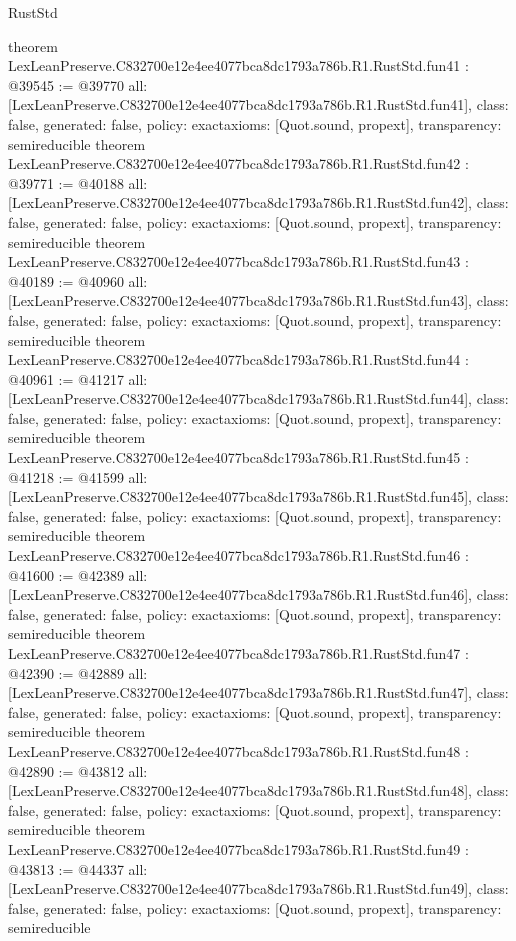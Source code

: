 \begin{lexlean}{RustStd}
\begin{coremodule}
{}
theorem LexLeanPreserve.C832700e12e4ee4077bca8dc1793a786b.R1.RustStd.fun41 : @39545 := @39770 {
  all: [LexLeanPreserve.C832700e12e4ee4077bca8dc1793a786b.R1.RustStd.fun41],
  class: false,
  generated: false,
  policy: exact{axioms: [Quot.sound, propext]},
  transparency: semireducible
}
theorem LexLeanPreserve.C832700e12e4ee4077bca8dc1793a786b.R1.RustStd.fun42 : @39771 := @40188 {
  all: [LexLeanPreserve.C832700e12e4ee4077bca8dc1793a786b.R1.RustStd.fun42],
  class: false,
  generated: false,
  policy: exact{axioms: [Quot.sound, propext]},
  transparency: semireducible
}
theorem LexLeanPreserve.C832700e12e4ee4077bca8dc1793a786b.R1.RustStd.fun43 : @40189 := @40960 {
  all: [LexLeanPreserve.C832700e12e4ee4077bca8dc1793a786b.R1.RustStd.fun43],
  class: false,
  generated: false,
  policy: exact{axioms: [Quot.sound, propext]},
  transparency: semireducible
}
theorem LexLeanPreserve.C832700e12e4ee4077bca8dc1793a786b.R1.RustStd.fun44 : @40961 := @41217 {
  all: [LexLeanPreserve.C832700e12e4ee4077bca8dc1793a786b.R1.RustStd.fun44],
  class: false,
  generated: false,
  policy: exact{axioms: [Quot.sound, propext]},
  transparency: semireducible
}
theorem LexLeanPreserve.C832700e12e4ee4077bca8dc1793a786b.R1.RustStd.fun45 : @41218 := @41599 {
  all: [LexLeanPreserve.C832700e12e4ee4077bca8dc1793a786b.R1.RustStd.fun45],
  class: false,
  generated: false,
  policy: exact{axioms: [Quot.sound, propext]},
  transparency: semireducible
}
theorem LexLeanPreserve.C832700e12e4ee4077bca8dc1793a786b.R1.RustStd.fun46 : @41600 := @42389 {
  all: [LexLeanPreserve.C832700e12e4ee4077bca8dc1793a786b.R1.RustStd.fun46],
  class: false,
  generated: false,
  policy: exact{axioms: [Quot.sound, propext]},
  transparency: semireducible
}
theorem LexLeanPreserve.C832700e12e4ee4077bca8dc1793a786b.R1.RustStd.fun47 : @42390 := @42889 {
  all: [LexLeanPreserve.C832700e12e4ee4077bca8dc1793a786b.R1.RustStd.fun47],
  class: false,
  generated: false,
  policy: exact{axioms: [Quot.sound, propext]},
  transparency: semireducible
}
theorem LexLeanPreserve.C832700e12e4ee4077bca8dc1793a786b.R1.RustStd.fun48 : @42890 := @43812 {
  all: [LexLeanPreserve.C832700e12e4ee4077bca8dc1793a786b.R1.RustStd.fun48],
  class: false,
  generated: false,
  policy: exact{axioms: [Quot.sound, propext]},
  transparency: semireducible
}
theorem LexLeanPreserve.C832700e12e4ee4077bca8dc1793a786b.R1.RustStd.fun49 : @43813 := @44337 {
  all: [LexLeanPreserve.C832700e12e4ee4077bca8dc1793a786b.R1.RustStd.fun49],
  class: false,
  generated: false,
  policy: exact{axioms: [Quot.sound, propext]},
  transparency: semireducible
}
\end{coremodule}
\end{lexlean}
